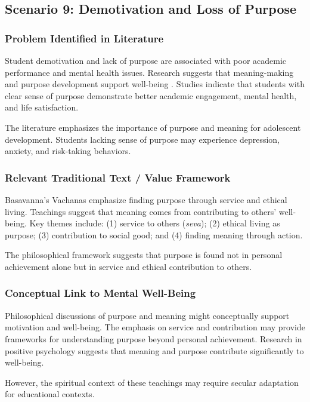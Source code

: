 \documentclass[12pt,a4paper,twocolumn]{article}
\begin{document}
\subsection{Scenario 9: Demotivation and Loss of Purpose}

\subsubsection{Problem Identified in Literature}

Student demotivation and lack of purpose are associated with poor academic performance and mental health issues. Research suggests that meaning-making and purpose development support well-being \citep{Narayan2015}. Studies indicate that students with clear sense of purpose demonstrate better academic engagement, mental health, and life satisfaction.

The literature emphasizes the importance of purpose and meaning for adolescent development. Students lacking sense of purpose may experience depression, anxiety, and risk-taking behaviors.

\subsubsection{Relevant Traditional Text / Value Framework}

Basavanna's Vachanas emphasize finding purpose through service and ethical living. Teachings suggest that meaning comes from contributing to others' well-being. Key themes include: (1) service to others (\textit{seva}); (2) ethical living as purpose; (3) contribution to social good; and (4) finding meaning through action.

The philosophical framework suggests that purpose is found not in personal achievement alone but in service and ethical contribution to others.

\subsubsection{Conceptual Link to Mental Well-Being}

Philosophical discussions of purpose and meaning might conceptually support motivation and well-being. The emphasis on service and contribution may provide frameworks for understanding purpose beyond personal achievement. Research in positive psychology suggests that meaning and purpose contribute significantly to well-being.

However, the spiritual context of these teachings may require secular adaptation for educational contexts.
\end{document}

